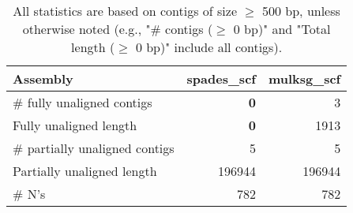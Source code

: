 \documentclass[12pt,a4paper]{article}
\begin{document}
\begin{table}[ht]
\begin{center}
\caption{All statistics are based on contigs of size $\geq$ 500 bp, unless otherwise noted (e.g., "\# contigs ($\geq$ 0 bp)" and "Total length ($\geq$ 0 bp)" include all contigs).}
\begin{tabular}{|l*{2}{|r}|}
\hline
Assembly & spades\_scf & mulksg\_scf \\ \hline
\# fully unaligned contigs & {\bf 0} & 3 \\ \hline
Fully unaligned length & {\bf 0} & 1913 \\ \hline
\# partially unaligned contigs & 5 & 5 \\ \hline
Partially unaligned length & 196944 & 196944 \\ \hline
\# N's & 782 & 782 \\ \hline
\end{tabular}
\end{center}
\end{table}
\end{document}
